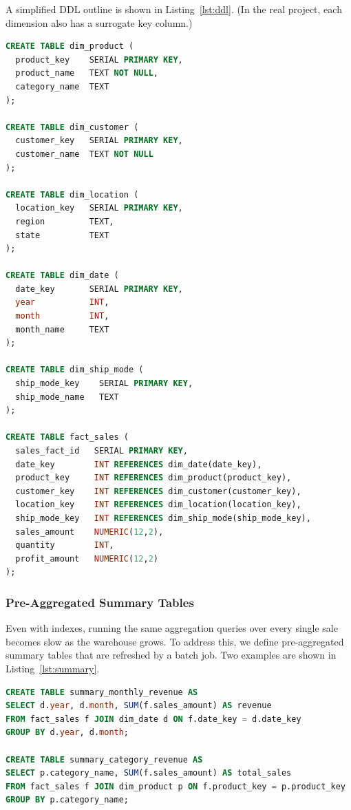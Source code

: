\documentclass[11pt,a4paper]{article}
\begin{document}
A simplified DDL outline is shown in Listing~\ref{lst:ddl}. (In the real
project, each dimension also has a surrogate key column.)

\begin{lstlisting}[language=SQL, caption={DDL outline for the star schema}, label={lst:ddl}]
CREATE TABLE dim_product (
  product_key    SERIAL PRIMARY KEY,
  product_name   TEXT NOT NULL,
  category_name  TEXT
);

CREATE TABLE dim_customer (
  customer_key   SERIAL PRIMARY KEY,
  customer_name  TEXT NOT NULL
);

CREATE TABLE dim_location (
  location_key   SERIAL PRIMARY KEY,
  region         TEXT,
  state          TEXT
);

CREATE TABLE dim_date (
  date_key       SERIAL PRIMARY KEY,
  year           INT,
  month          INT,
  month_name     TEXT
);

CREATE TABLE dim_ship_mode (
  ship_mode_key    SERIAL PRIMARY KEY,
  ship_mode_name   TEXT
);

CREATE TABLE fact_sales (
  sales_fact_id   SERIAL PRIMARY KEY,
  date_key        INT REFERENCES dim_date(date_key),
  product_key     INT REFERENCES dim_product(product_key),
  customer_key    INT REFERENCES dim_customer(customer_key),
  location_key    INT REFERENCES dim_location(location_key),
  ship_mode_key   INT REFERENCES dim_ship_mode(ship_mode_key),
  sales_amount    NUMERIC(12,2),
  quantity        INT,
  profit_amount   NUMERIC(12,2)
);
\end{lstlisting}

\subsubsection*{Pre-Aggregated Summary Tables}

Even with indexes, running the same aggregation queries over every single
sale becomes slow as the warehouse grows. To address this, we define
pre-aggregated summary tables that are refreshed by a batch job. Two
examples are shown in Listing~\ref{lst:summary}.

\begin{lstlisting}[language=SQL, caption={Example summary tables}, label={lst:summary}]
CREATE TABLE summary_monthly_revenue AS
SELECT d.year, d.month, SUM(f.sales_amount) AS revenue
FROM fact_sales f JOIN dim_date d ON f.date_key = d.date_key
GROUP BY d.year, d.month;

CREATE TABLE summary_category_revenue AS
SELECT p.category_name, SUM(f.sales_amount) AS total_sales
FROM fact_sales f JOIN dim_product p ON f.product_key = p.product_key
GROUP BY p.category_name;
\end{lstlisting}
\end{document}
